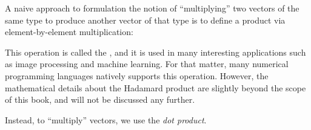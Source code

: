 \documentclass{ximera}
\begin{document}
\begin{warning}
  A naive approach to formulation the notion of ``multiplying'' two
  vectors of the same type to produce another vector of that type is
  to define a product via element-by-element multiplication:
  \begin{center}
  \end{center}
  This operation is called the ,
  and it is used in many interesting applications such as image
  processing and machine learning. For that matter, many numerical
  programming languages natively supports this operation. However, the
  mathematical details about the Hadamard product are slightly beyond
  the scope of this book, and will not be discussed any further.
\end{warning}
 Instead, to ``multiply'' vectors, we use the \textit{dot product}.
\end{document}
